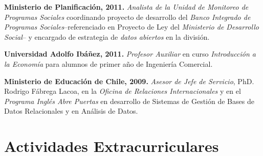 \documentclass[letterpaper, 12pt]{article}
\renewenvironment{itemize}{
  \begin{list}{}{
    \setlength{\leftmargin}{0.45cm}
  }
}{
  \end{list}
}
\begin{document}
\begin{itemize}
\item \textbf{Ministerio de Planificación, 2011.} \emph{Analista de la Unidad de Monitoreo de Programas Sociales} coordinando proyecto de desarrollo del \emph{Banco Integrado de Programas Sociales}--referenciado en Proyecto de Ley del \emph{Ministerio de Desarrollo Social}-- y encargado de estrategia de \emph{datos abiertos} en la división.
\item \textbf{Universidad Adolfo Ibáñez, 2011.} \emph{Profesor Auxiliar} en curso \emph{Introducción a la Economía} para alumnos de primer año de Ingeniería Comercial.
\item \textbf{Ministerio de Educación de Chile, 2009.} \emph{Asesor de Jefe de Servicio}, PhD. Rodrigo Fábrega Lacoa, en la \emph{Oficina de Relaciones Internacionales} y en el \emph{Programa Inglés Abre Puertas} en desarrollo de Sistemas de Gestión de Bases de Datos Relacionales y en Análisis de Datos.
\end{itemize}


\section*{Actividades Extracurriculares}
\end{document}
